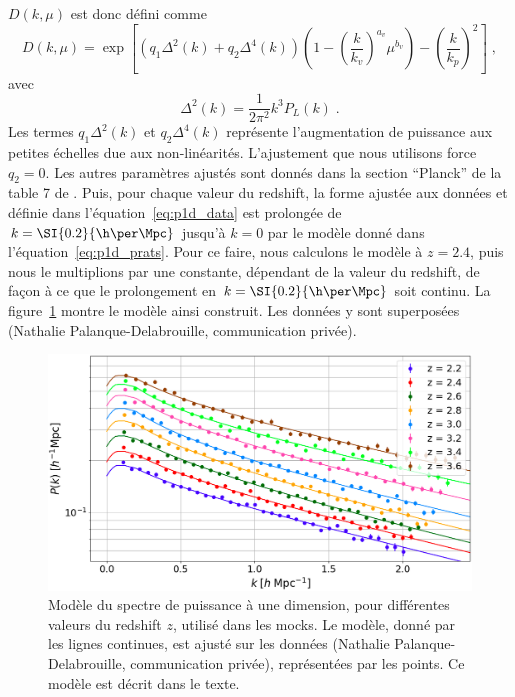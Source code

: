 $D(k,\mu)$ est donc défini comme
\begin{equation}
  \label{eq:p1d_prats}
  D(k, \mu) = \exp\left[
    \left(q_1 \Delta^2(k) + q_2 \Delta^4(k) \right) \left(1 - \left(\frac{k}{k_v}\right)^{a_v} \mu^{b_v} \right)
    - \left(\frac{k}{k_p} \right)^2 
  \right]
  \; ,
\end{equation}
avec
\begin{equation}
  \Delta^2(k) = \frac{1}{2 \pi^2} k^3 P_L(k) \; .
\end{equation}
Les termes $q_1 \Delta^2(k)$ et $q_2 \Delta^4(k)$ représente l'augmentation de puissance aux petites échelles due aux non-linéarités. L'ajustement que nous utilisons force $q_2 = 0$. Les autres paramètres ajustés sont donnés dans la section ``Planck'' de la table 7 de \textcite{Arinyo-i-Prats2015}.
Puis, pour chaque valeur du redshift, la forme ajustée aux données et définie dans l'équation~\ref{eq:p1d_data} est prolongée de $k = \SI{0.2}{\h\per\Mpc}$ jusqu'à $k = 0$ par le modèle donné dans l'équation~\ref{eq:p1d_prats}.
Pour ce faire, nous calculons le modèle à $z = \num{2.4}$, puis nous le multiplions par une constante, dépendant de la valeur du redshift, de façon à ce que le prolongement en $k = \SI{0.2}{\h\per\Mpc}$ soit continu.
La figure~\ref{fig:p1d_data} montre le modèle ainsi construit. Les données y sont superposées (Nathalie Palanque-Delabrouille, communication privée).
\begin{figure}
  \centering
  \includegraphics[scale=0.35]{p1d_model_data}
  \caption{Modèle du spectre de puissance à une dimension, pour différentes valeurs du redshift $z$, utilisé dans les mocks. Le modèle, donné par les lignes continues, est ajusté sur les données (Nathalie Palanque-Delabrouille, communication privée), représentées par les points. Ce modèle est décrit dans le texte.}
  \label{fig:p1d_data}
\end{figure}
